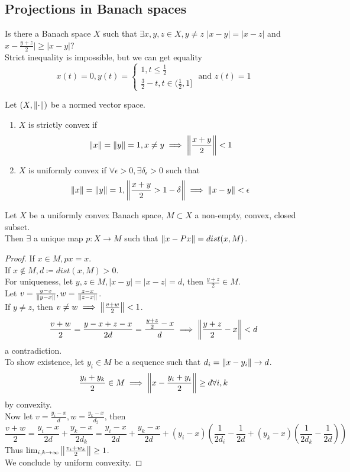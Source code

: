 \documentclass[../main.tex]{subfiles}
\begin{document}
\subsection{Projections in Banach spaces}
Is there a Banach space $X$ such that $\exists x,y,z \in X, y  \neq z$ $|x-y| = |x-z|$ and $x- \frac{y+z}{2}| \geq |x-y|$?\\
Strict inequality is impossible, but we can get equality
\[ 
x( t) =0 , y( t) = 
\begin{cases}
1, t \leq \frac{1}{2}\\
\frac{3}{2} -t , t \in ( \frac{1}{2},1] 
\end{cases}
\text{ and } z( t) =1
\]
\begin{defn}
	Let $( X, \left\lVert\cdot\right\rVert) $ be a normed vector space.
	\begin{enumerate}
	\item $X$ is strictly convex if 
		\[ 
			\left\lVert x\right\rVert = \left\lVert y\right\rVert =1 , x\neq y \implies \left\lVert\frac{x+y}{2}\right\rVert < 1
		\]
		
	\item $X$ is uniformly convex if $\forall \epsilon>0, \exists \delta_{\epsilon} >0$ such that 
		\[ 
			\left\lVert x\right\rVert = \left\lVert y\right\rVert =1, \left\lVert \frac{x+y}{2}> 1-\delta\right\rVert 	\implies \left\lVert x-y\right\rVert < \epsilon
		\]
		
	\end{enumerate}
\end{defn}
\begin{thm}
	Let $X$ be a uniformly convex Banach space, $M \subset X$ a non-empty, convex, closed subset.\\
	Then $\exists $ a unique map $p:X\to M$ such that $\left\lVert x-Px\right\rVert = dist( x,M) $.
\end{thm}
\begin{proof}
If $x\in M, px=x$.\\
If $x\notin M, d \coloneqq dist( x,M) >0$.\\
For uniqueness, let $y,z\in M, |x-y| = |x-z| =d$, then $ \frac{y+z}{2}\in M$.\\
Let $v= \frac{y-x}{\left\lVert y-x\right\rVert}, w = \frac{z-x}{\left\lVert z-x\right\rVert } $.\\
If $y \neq z$, then $v\neq w\implies \left\lVert  \frac{v+w}{2}\right\rVert <1$.\\
\[ 
\frac{v+w}{2}= \frac{y-x+z -x}{2d}= \frac{ \frac{y+z}{2}-x}{d}\implies \left\lVert\frac{y+z}{2} -x\right\rVert < d
\]
a contradiction.\\
To show existence, let $y_i \in M$ be a sequence such that $d_i = \left\lVert x-y_i\right\rVert \to d$.\\
\[ 
\frac{y_i+ y_k}{2}\in M \implies \left\lVert x- \frac{y_i +y_i}{2}\right\rVert \geq d \forall i,k 
\]
by convexity.\\
Now let $v= \frac{y_i-x}{d}, w = \frac{y_k -x}{d_2}$, then
\[ 
\frac{v+w}{2} = \frac{y_i -x}{2d }+ \frac{y_k -x}{2 d_k}= \frac{y_i -x}{2d}+ \frac{y_k -x}{2d} + ( y_i -x) \left( \frac{1}{2d_i} - \frac{1}{2d}+ ( y_k -x) ( \frac{1}{2d_k}- \frac{1}{2d}) \right) 
\]
Thus $\lim_{i ,k \to \infty } \left\lVert  \frac{v_i+w_k}{2}\right\rVert \geq 1$.\\
We conclude by uniform convexity.
\end{proof}
\end{document}
